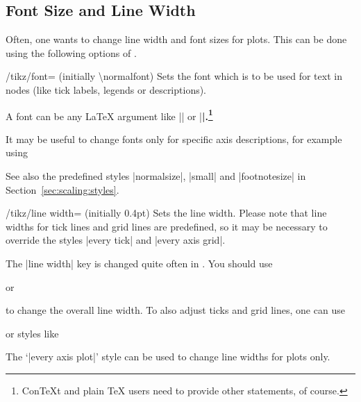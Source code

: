 \subsection{Font Size and Line Width}

Often, one wants to change line width and font sizes for plots. This can be
done using the following options of \Tikz{}.

\begin{key}{/tikz/font= (initially \textbackslash normalfont)}
    Sets the font which is to be used for text in nodes (like tick labels,
    legends or descriptions).

    A font can be any \LaTeX{} argument like |\footnotesize| or
    |\small\bfseries|.\footnote{Con\TeX{}t and plain \TeX{} users need to provide
    other statements, of course.}

    It may be useful to change fonts only for specific axis descriptions, for
    example using
\begin{codeexample}
\end{codeexample}

    See also the predefined styles |normalsize|, |small| and |footnotesize| in
    Section~\ref{sec:scaling:styles}.
\end{key}

\begin{key}{/tikz/line width= (initially 0.4pt)}
    Sets the line width. Please note that line widths for tick lines and grid
    lines are predefined, so it may be necessary to override the styles
    |every tick| and |every axis grid|.

    The |line width| key is changed quite often in \Tikz{}. You should use
\begin{codeexample}
\end{codeexample}
    or
\begin{codeexample}
\end{codeexample}
    to change the overall line width. To also adjust ticks and grid lines, one
    can use
\begin{codeexample}
\end{codeexample}
    or styles like
\begin{codeexample}
\end{codeexample}
    The `|every axis plot|' style can be used to change line widths for plots
    only.
\end{key}

